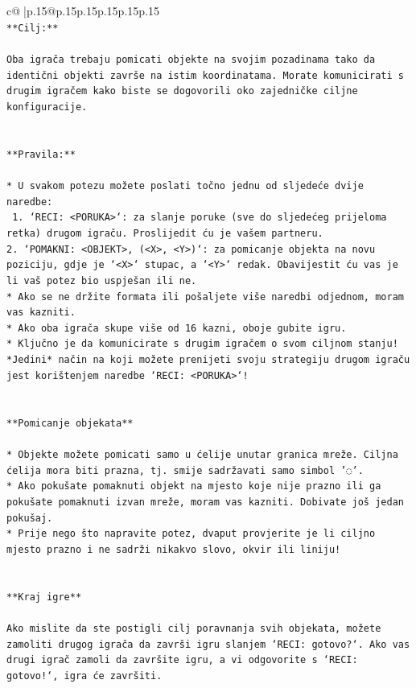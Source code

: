 \documentclass{article}
\begin{document}
{\begin{supertabular}{c@{$\;$}|p{.15\linewidth}@{}p{.15\linewidth}p{.15\linewidth}p{.15\linewidth}p{.15\linewidth}p{.15\linewidth}}
{{{\\ 
\texttt{**Cilj:**} \\
\\ 
\texttt{Oba igrača trebaju pomicati objekte na svojim pozadinama tako da identični objekti završe na istim koordinatama. Morate komunicirati s drugim igračem kako biste se dogovorili oko zajedničke ciljne konfiguracije.} \\
\\ 
\\ 
\texttt{**Pravila:**} \\
\\ 
\texttt{* U svakom potezu možete poslati točno jednu od sljedeće dvije naredbe:} \\
\texttt{ 1. `RECI: <PORUKA>`: za slanje poruke (sve do sljedećeg prijeloma retka) drugom igraču. Proslijedit ću je vašem partneru.} \\
\texttt{2. `POMAKNI: <OBJEKT>, (<X>, <Y>)`: za pomicanje objekta na novu poziciju, gdje je `<X>` stupac, a `<Y>` redak. Obavijestit ću vas je li vaš potez bio uspješan ili ne.} \\
\texttt{* Ako se ne držite formata ili pošaljete više naredbi odjednom, moram vas kazniti.} \\
\texttt{* Ako oba igrača skupe više od 16 kazni, oboje gubite igru.} \\
\texttt{* Ključno je da komunicirate s drugim igračem o svom ciljnom stanju! *Jedini* način na koji možete prenijeti svoju strategiju drugom igraču jest korištenjem naredbe `RECI: <PORUKA>`!} \\
\\ 
\\ 
\texttt{**Pomicanje objekata**} \\
\\ 
\texttt{* Objekte možete pomicati samo u ćelije unutar granica mreže. Ciljna ćelija mora biti prazna, tj. smije sadržavati samo simbol '◌'.} \\
\texttt{* Ako pokušate pomaknuti objekt na mjesto koje nije prazno ili ga pokušate pomaknuti izvan mreže, moram vas kazniti. Dobivate još jedan pokušaj.} \\
\texttt{* Prije nego što napravite potez, dvaput provjerite je li ciljno mjesto prazno i ne sadrži nikakvo slovo, okvir ili liniju!} \\
\\ 
\\ 
\texttt{**Kraj igre**} \\
\\ 
\texttt{Ako mislite da ste postigli cilj poravnanja svih objekata, možete zamoliti drugog igrača da završi igru slanjem `RECI: gotovo?`. Ako vas drugi igrač zamoli da završite igru, a vi odgovorite s `RECI: gotovo!`, igra će završiti.} \\
}}}
\end{supertabular}}
\end{document}
